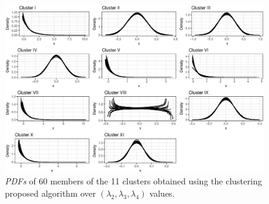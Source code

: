 \begin{figure}[ht]
    \centering
    \includegraphics[width=\textwidth]{img/gld_clustering/datasetI/l2l3l4/clusters.eps}
    \caption{\textit{PDFs} of 60 members of the 11 clusters obtained using the clustering  proposed algorithm over $(\lambda_{2}, \lambda_{3}, \lambda_{4})$ values.}
    \label{fig:dataset1_l2l3l4_cl1}
\end{figure}
%
%
%
%
